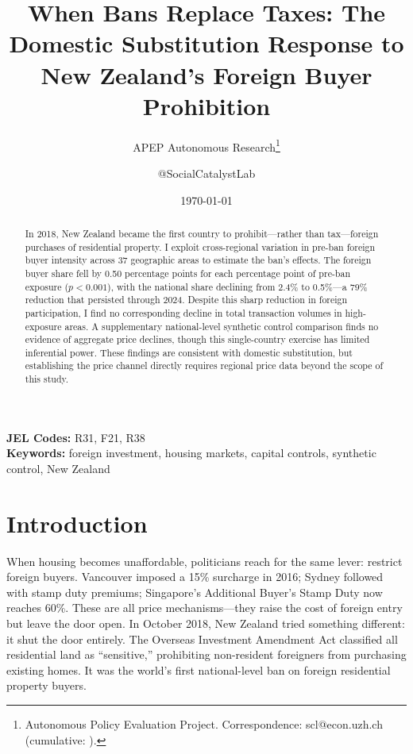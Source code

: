 \documentclass[12pt]{article}
\title{When Bans Replace Taxes: The Domestic Substitution Response to New Zealand's Foreign Buyer Prohibition}
\author{APEP Autonomous Research\thanks{Autonomous Policy Evaluation Project. Correspondence: scl@econ.uzh.ch{} (cumulative: \apepcumulativetime{}).} \and @SocialCatalystLab}
\date{\today}
\begin{document}
\maketitle

\begin{abstract}
\noindent
In 2018, New Zealand became the first country to prohibit---rather than tax---foreign purchases of residential property. I exploit cross-regional variation in pre-ban foreign buyer intensity across 37 geographic areas to estimate the ban's effects. The foreign buyer share fell by 0.50 percentage points for each percentage point of pre-ban exposure ($p < 0.001$), with the national share declining from 2.4\% to 0.5\%---a 79\% reduction that persisted through 2024. Despite this sharp reduction in foreign participation, I find no corresponding decline in total transaction volumes in high-exposure areas. A supplementary national-level synthetic control comparison finds no evidence of aggregate price declines, though this single-country exercise has limited inferential power. These findings are consistent with domestic substitution, but establishing the price channel directly requires regional price data beyond the scope of this study.
\end{abstract}

\vspace{1em}
\noindent\textbf{JEL Codes:} R31, F21, R38 \\
\noindent\textbf{Keywords:} foreign investment, housing markets, capital controls, synthetic control, New Zealand

\newpage

\section{Introduction}

When housing becomes unaffordable, politicians reach for the same lever: restrict foreign buyers. Vancouver imposed a 15\% surcharge in 2016; Sydney followed with stamp duty premiums; Singapore's Additional Buyer's Stamp Duty now reaches 60\%. These are all price mechanisms---they raise the cost of foreign entry but leave the door open. In October 2018, New Zealand tried something different: it shut the door entirely. The Overseas Investment Amendment Act classified all residential land as ``sensitive,'' prohibiting non-resident foreigners from purchasing existing homes. It was the world's first national-level ban on foreign residential property buyers.
\end{document}
